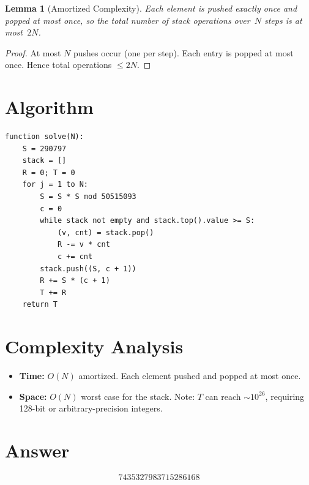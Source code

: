 \documentclass[12pt]{article}
\newtheorem{lemma}[theorem]{Lemma}
\begin{document}
\begin{lemma}[Amortized Complexity]
Each element is pushed exactly once and popped at most once, so the total number of stack operations over~$N$ steps is at most~$2N$.
\end{lemma}

\begin{proof}
At most $N$ pushes occur (one per step). Each entry is popped at most once. Hence total operations $\le 2N$.
\end{proof}

\section{Algorithm}

\begin{verbatim}
function solve(N):
    S = 290797
    stack = []
    R = 0; T = 0
    for j = 1 to N:
        S = S * S mod 50515093
        c = 0
        while stack not empty and stack.top().value >= S:
            (v, cnt) = stack.pop()
            R -= v * cnt
            c += cnt
        stack.push((S, c + 1))
        R += S * (c + 1)
        T += R
    return T
\end{verbatim}

\section{Complexity Analysis}

\begin{itemize}
\item \textbf{Time:} $O(N)$ amortized. Each element pushed and popped at most once.
\item \textbf{Space:} $O(N)$ worst case for the stack. Note: $T$ can reach $\sim 10^{26}$, requiring 128-bit or arbitrary-precision integers.
\end{itemize}

\section{Answer}

\[
\boxed{7435327983715286168}
\]
\end{document}
